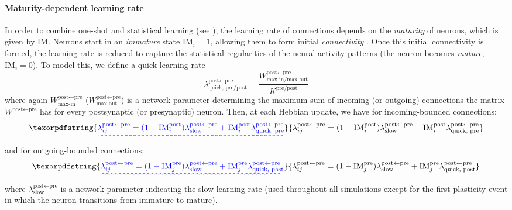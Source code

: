 \documentclass{article}
\providecommand{\DIFaddtex}[1]{{\protect\color{blue}\uwave{#1}}} %
\providecommand{\DIFaddbegin}{} %
\providecommand{\DIFaddend}{} %
\providecommand{\DIFadd}[1]{\texorpdfstring{\DIFaddtex{#1}}{#1}} %
\begin{document}
\paragraph*{Maturity-dependent learning rate}
In order to combine one-shot and statistical learning (see ), the learning rate of connections depends on the \textit{maturity} of neurons, which is given by $\textrm{IM}$. Neurons start in an \textit{immature} state $\textrm{IM}_i = 1$, allowing them to form initial \textit{connectivity  \DIFaddbegin \DIFadd{estimates}\DIFaddend }. Once this initial connectivity is formed, the learning rate is reduced to capture the statistical regularities of the neural activity patterns (the neuron becomes \textit{mature}, $\textrm{IM}_i = 0$). To model this, we define a quick learning rate
\begin{equation}
        \lambda^{\textrm{post}\leftarrow\textrm{pre}}_\textrm{quick, pre/post} = \frac{W^{\textrm{post}\leftarrow\textrm{pre}}_\textrm{max-in/max-out}}{K^\textrm{pre/post}} 
        \label{eq:quick_lambda}
\end{equation}
where again $W^{\textrm{post}\leftarrow\textrm{pre}}_\textrm{max-in}$ (\DIFaddbegin \DIFadd{or }\DIFaddend $W^{\textrm{post}\leftarrow\textrm{pre}}_\textrm{max-out}$)  is a network parameter determining the maximum sum of incoming (or outgoing) connections the matrix $W^{\textrm{post}\leftarrow\textrm{pre}}$ has for every postsynaptic (or presynaptic) neuron. Then, at each Hebbian update, we have for incoming-bounded connections:
 \DIFaddbegin \begin{equation}
    \DIFadd{\lambda_{ij}^{\textrm{post} \leftarrow \textrm{pre}} = (1 - \textrm{IM}^\textrm{post}_i)\lambda^{\textrm{post} \leftarrow \textrm{pre}}_\textrm{slow} + \textrm{IM}^\textrm{post}_i\lambda^{\textrm{post}\leftarrow\textrm{pre}}_\textrm{quick, pre}
}\end{equation}\DIFaddend 
and for outgoing-bounded connections:
 \DIFaddbegin \begin{equation}
    \DIFadd{\lambda_{ij}^{\textrm{post} \leftarrow \textrm{pre}} = (1 - \textrm{IM}^\textrm{pre}_j)\lambda^{\textrm{post} \leftarrow \textrm{pre}}_\textrm{slow} + \textrm{IM}^\textrm{pre}_j\lambda^{\textrm{post}\leftarrow\textrm{pre}}_\textrm{quick, post}
}\end{equation}\DIFaddend 
where $\lambda^{\textrm{post} \leftarrow \textrm{pre}}_\textrm{slow}$ is a network parameter indicating the slow learning rate (used throughout all simulations except for the first plasticity event in which the neuron transitions from immature to mature).
\end{document}
